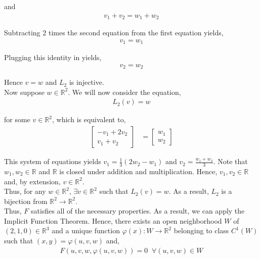 \documentclass[12pt]{article}
\begin{document}
and 
\begin{align*}
v_1 + v_2 = w_1 + w_2
\end{align*}

Subtracting $2$ times the second equation from the first equation yields,
\begin{align*}
v_1 = w_1
\end{align*}

Plugging this identity in yields,
\begin{align*}
v_2 = w_2
\end{align*}

Hence $v = w$ and $L_2$ is injective.\\

Now suppose $w \in \mathbb{R}^2$. We will now consider the equation,
\begin{align*}
L_2(v) = w
\end{align*}

for some $v \in \mathbb{R}^2$, which is equivalent to,
\begin{align*}
\begin{bmatrix}
-v_1 + 2v_2 \\
v_1 + v_2
\end{bmatrix} &= \begin{bmatrix} w_1 \\ w_2 \end{bmatrix}
\end{align*}

This system of equations yields $v_1 = \frac{1}{3} (2w_2 - w_1)$ and $v_2 = \frac{w_1 + w_2}{3}$. Note that $w_1, w_2 \in \mathbb{R}$ and $\mathbb{R}$ is closed under addition and multiplication. Hence, $v_1, v_2 \in \mathbb{R}$ and, by extension, $v \in \mathbb{R}^2$.\\

Thus, for any $w \in \mathbb{R}^2$, $\exists v \in \mathbb{R}^2$ such that $L_2(v) = w$. As a result, $L_2$ is a bijection from $\mathbb{R}^2 \to \mathbb{R}^2$.\\

Thus, $F$ satisfies all of the necessary properties. As a result, we can apply the Implicit Function Theorem. Hence, there exists an open neighborhood $W$ of $(2, 1, 0) \in \mathbb{R}^3$ and a unique function $\varphi(x): W \to \mathbb{R}^2$ belonging to class $C^1(W)$ such that $(x, y)= \varphi(u, v, w)$ and,
\begin{align*}
F(u, v, w, \varphi(u, v, w)) = 0 \;\; \forall (u, v, w) \in W
\end{align*}
\end{document}

